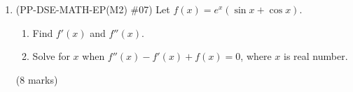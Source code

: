 \documentclass[12pt]{article}
\begin{document}
\begin{enumerate}
            \hrulefill
            
            \hrulefill
            
            \hrulefill
            
            \hrulefill
            
            \hrulefill
            
            \hrulefill
            
            \hrulefill
            
            \hrulefill
            
            \hrulefill
            
            \hrulefill
            
            \hrulefill
            
            \hrulefill
            
            \hrulefill
            
            \hrulefill
            
            \hrulefill
            
            \hrulefill
            
            \hrulefill
            
            \hrulefill
            
            \hrulefill
            
            \hrulefill

        \pagebreak
        \item (PP-DSE-MATH-EP(M2) \#07) Let $f(x)=e^x(\sin{x}+\cos{x})$.\begin{enumerate}
            \item Find $f'(x)$ and $f''(x)$.
            \item Solve for $x$ when $f''(x)-f'(x)+f(x)=0$, where $x$ is real number.
        \end{enumerate}\hfill(8 marks)
        
        \hrulefill
            
            \hrulefill
            
            \hrulefill
            
            \hrulefill
            
            \hrulefill
            
            \hrulefill
            
            \hrulefill
            
            \hrulefill
            

\end{enumerate}
\end{document}
